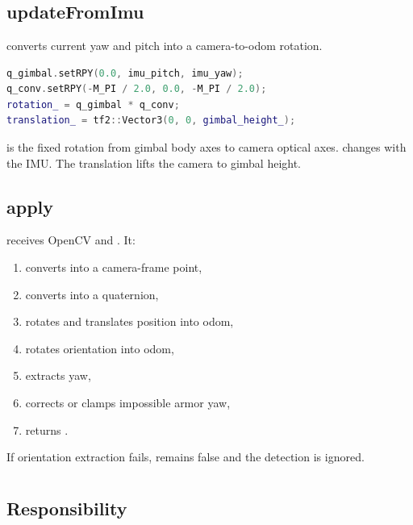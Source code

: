 \section{}

\subsection{updateFromImu}

 converts current yaw and pitch into a camera-to-odom
rotation.

\begin{lstlisting}[language=C++]
q_gimbal.setRPY(0.0, imu_pitch, imu_yaw);
q_conv.setRPY(-M_PI / 2.0, 0.0, -M_PI / 2.0);
rotation_ = q_gimbal * q_conv;
translation_ = tf2::Vector3(0, 0, gimbal_height_);
\end{lstlisting}

 is the fixed rotation from gimbal body axes to camera optical
axes.  changes with the IMU. The translation lifts the camera
to gimbal height.

\subsection{apply}

 receives OpenCV  and . It:

\begin{enumerate}
  \item converts  into a camera-frame point,
  \item converts  into a quaternion,
  \item rotates and translates position into odom,
  \item rotates orientation into odom,
  \item extracts yaw,
  \item corrects or clamps impossible armor yaw,
  \item returns .
\end{enumerate}

If orientation extraction fails,  remains false and the detection
is ignored.

\section{}

\subsection{Responsibility}

